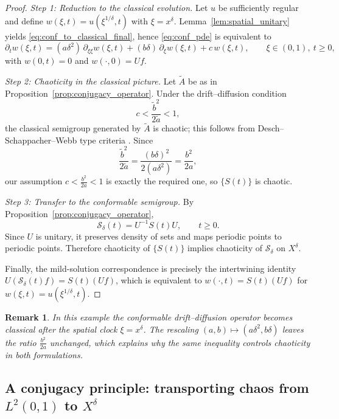 \documentclass[preprint,12pt]{elsarticle}
\newtheorem{remark}{Remark}
\newtheorem{proof}{Proof}
\begin{document}
\begin{proof}
\emph{Step 1: Reduction to the classical evolution.}
Let $u$ be sufficiently regular and define $w(\xi,t)=u(\xi^{1/\delta},t)$ with $\xi=x^\delta$.
Lemma~\ref{lem:spatial_unitary} yields \eqref{eq:conf_to_classical_final}, hence
\eqref{eq:conf_pde} is equivalent to
\[
\partial_t w(\xi,t)
=
(a\delta^2)\,\partial_{\xi\xi}w(\xi,t)
+
(b\delta)\,\partial_\xi w(\xi,t)
+
c\,w(\xi,t),
\qquad \xi\in(0,1),\ t\ge 0,
\]
with $w(0,t)=0$ and $w(\cdot,0)=Uf$.

\medskip
\emph{Step 2: Chaoticity in the classical picture.}
Let $\widetilde A$ be as in Proposition~\ref{prop:conjugacy_operator}.
Under the drift--diffusion condition
\[
c<\frac{\widetilde b^2}{2\widetilde a}<1,
\]
the classical semigroup generated by $\widetilde A$ is chaotic; this follows from
Desch--Schappacher--Webb type criteria \cite{desch1997}.
Since
\[
\frac{\widetilde b^2}{2\widetilde a}
=
\frac{(b\delta)^2}{2(a\delta^2)}
=
\frac{b^2}{2a},
\]
our assumption $c<\frac{b^2}{2a}<1$ is exactly the required one, so $\{S(t)\}$ is chaotic.

\medskip
\emph{Step 3: Transfer to the conformable semigroup.}
By Proposition~\ref{prop:conjugacy_operator},
\[
\mathcal S_\delta(t)=U^{-1}S(t)U,\qquad t\ge0.
\]
Since $U$ is unitary, it preserves density of sets and maps periodic points to periodic points.
Therefore chaoticity of $\{S(t)\}$ implies chaoticity of $\mathcal S_\delta$ on $X^\delta$.

\medskip
Finally, the mild-solution correspondence is precisely the intertwining identity
$U(\mathcal S_\delta(t)f)=S(t)(Uf)$, which is equivalent to
$w(\cdot,t)=S(t)(Uf)$ for $w(\xi,t)=u(\xi^{1/\delta},t)$.
\end{proof}

\begin{remark}\label{rem:what_conformable_here}
In this example the conformable drift--diffusion operator becomes classical after the spatial clock
$\xi=x^\delta$.
The rescaling $(a,b)\mapsto(a\delta^2,b\delta)$ leaves the ratio $\frac{b^2}{2a}$ unchanged, which
explains why the same inequality controls chaoticity in both formulations.
\end{remark}

\subsection{A conjugacy principle: transporting chaos from $L^2(0,1)$ to $X^\delta$}\label{subsec:app2}
\end{document}
